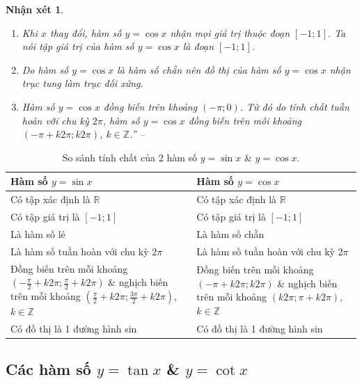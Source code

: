\documentclass[oneside]{book}
\numberwithin{equation}{section}
\newtheorem{nhanxet}{Nhận xét}[section]
\begin{document}
\begin{nhanxet}
	\begin{enumerate}
		\item Khi $x$ thay đổi, hàm số $y = \cos x$ nhận mọi giá trị thuộc đoạn $[-1;1]$. Ta nói \emph{tập giá trị} của hàm số $y = \cos x$ là đoạn $[-1;1]$.
		\item Do hàm số $y = \cos x$ là hàm số chẵn nên đồ thị của hàm số $y = \cos x$ nhận trục tung làm trục đối xứng.
		\item Hàm số $y = \cos x$ đồng biến trên khoảng $(-\pi;0)$. Từ đó do tính chất tuần hoàn với chu kỳ $2\pi$, hàm số $y = \cos x$ đồng biến trên mỗi khoảng $(-\pi + k2\pi;k2\pi)$, $k\in\mathbb{Z}$.'' -- \cite[pp. 8--9]{SGK_Toan_11_dai_so_giai_tich_nang_cao}
	\end{enumerate}
\end{nhanxet}

\begin{table}[H]
	\centering
	\begin{tabular}{|p{9cm}|p{9cm}|}
		\hline
		\textbf{Hàm số $y = \sin x$} & \textbf{Hàm số $y = \cos x$} \\
		\hline
		Có tập xác định là $\mathbb{R}$ & Có tập xác định là $\mathbb{R}$ \\
		\hline
		Có tập giá trị là $[-1;1]$ & Có tập giá trị là $[-1;1]$ \\
		\hline
		Là hàm số lẻ & Là hàm số chẵn \\
		\hline
		Là hàm số tuần hoàn với chu kỳ $2\pi$ & Là hàm số tuần hoàn với chu kỳ $2\pi$ \\
		\hline
		Đồng biến trên mỗi khoảng $\left(-\frac{\pi}{2} + k2\pi;\frac{\pi}{2} + k2\pi\right)$ \& nghịch biến trên mỗi khoảng $\left(\frac{\pi}{2} + k2\pi;\frac{3\pi}{2} + k2\pi\right)$, $k\in\mathbb{Z}$ & Đồng biến trên mỗi khoảng $(-\pi + k2\pi;k2\pi)$ \& nghịch biến trên mỗi khoảng $(k2\pi;\pi + k2\pi)$, $k\in\mathbb{Z}$ \\
		\hline
		Có đồ thị là 1 đường hình sin & Có đồ thị là 1 đường hình sin \\
		\hline
	\end{tabular}
	\caption{So sánh tính chất của 2 hàm số $y = \sin x$ \& $y = \cos x$.}
\end{table}

\subsection{Các hàm số $y = \tan x$ \& $y = \cot x$}
\end{document}
